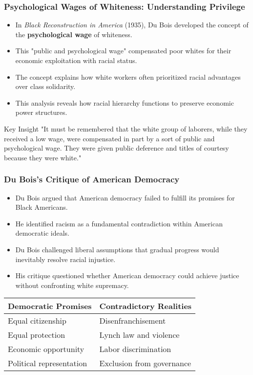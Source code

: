 \documentclass{beamer}
\begin{document}
	\begin{frame}
		\frametitle{Psychological Wages of Whiteness: Understanding Privilege}
		
		\begin{itemize}
			\item In \textit{Black Reconstruction in America} (1935), Du Bois developed the concept of the \textbf{psychological wage} of whiteness.
			\item This "public and psychological wage" compensated poor whites for their economic exploitation with racial status.
			\item The concept explains how white workers often prioritized racial advantages over class solidarity.
			\item This analysis reveals how racial hierarchy functions to preserve economic power structures.
		\end{itemize}
		
		\begin{block}{Key Insight}
			"It must be remembered that the white group of laborers, while they received a low wage, were compensated in part by a sort of public and psychological wage. They were given public deference and titles of courtesy because they were white."
		\end{block}
		
	\end{frame}
	
	\begin{frame}
		\frametitle{Du Bois's Critique of American Democracy}
		
		\begin{itemize}
			\item Du Bois argued that American democracy failed to fulfill its promises for Black Americans.
			\item He identified racism as a fundamental contradiction within American democratic ideals.
			\item Du Bois challenged liberal assumptions that gradual progress would inevitably resolve racial injustice.
			\item His critique questioned whether American democracy could achieve justice without confronting white supremacy.
		\end{itemize}
		
		\begin{table}
			\begin{tabular}{ll}
				\toprule
				\textbf{Democratic Promises} & \textbf{Contradictory Realities} \\
				\midrule
				Equal citizenship & Disenfranchisement \\
				Equal protection & Lynch law and violence \\
				Economic opportunity & Labor discrimination \\
				Political representation & Exclusion from governance \\
				\bottomrule
			\end{tabular}
		\end{table}
		
	\end{frame}
	
\end{document}
